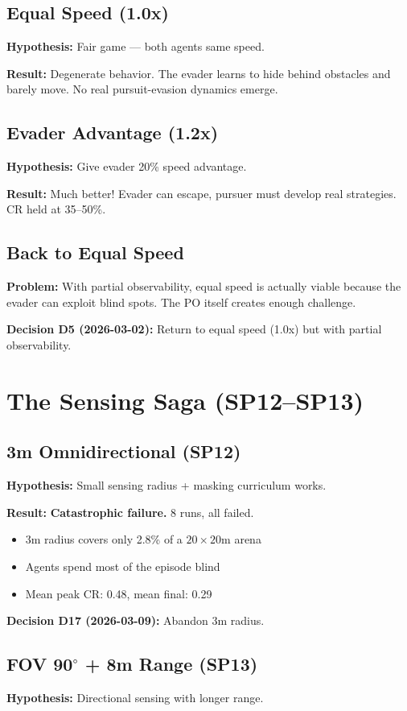 \documentclass[11pt,a4paper]{report}
\begin{document}
\subsection{Equal Speed (1.0x)}
\textbf{Hypothesis:} Fair game --- both agents same speed.

\textbf{Result:} Degenerate behavior. The evader learns to hide behind obstacles and barely move. No real pursuit-evasion dynamics emerge.

\subsection{Evader Advantage (1.2x)}
\textbf{Hypothesis:} Give evader 20\% speed advantage.

\textbf{Result:} Much better! Evader can escape, pursuer must develop real strategies. CR held at 35--50\%.

\subsection{Back to Equal Speed}
\textbf{Problem:} With partial observability, equal speed is actually viable because the evader can exploit blind spots. The PO itself creates enough challenge.

\textbf{Decision D5 (2026-03-02):} Return to equal speed (1.0x) but with partial observability.

\section{The Sensing Saga (SP12--SP13)}

\subsection{3m Omnidirectional (SP12)}
\textbf{Hypothesis:} Small sensing radius + masking curriculum works.

\textbf{Result:} \textbf{Catastrophic failure.} 8 runs, all failed.
\begin{itemize}
    \item 3m radius covers only 2.8\% of a $20 \times 20$m arena
    \item Agents spend most of the episode blind
    \item Mean peak CR: 0.48, mean final: 0.29
\end{itemize}

\textbf{Decision D17 (2026-03-09):} Abandon 3m radius.

\subsection{FOV 90$^\circ$ + 8m Range (SP13)}
\textbf{Hypothesis:} Directional sensing with longer range.
\end{document}
